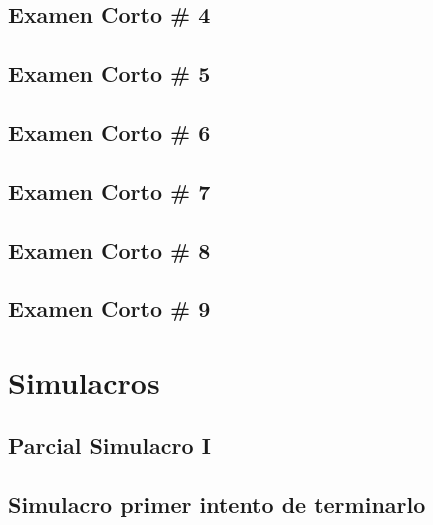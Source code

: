 \documentclass[openany]{book}
\begin{document}
\chapter{Examen Corto \# 4}
% 

\chapter{Examen Corto \# 5}


\chapter{Examen Corto \# 6}


\chapter{Examen Corto \# 7}


\chapter{Examen Corto \# 8}


\chapter{Examen Corto \# 9}




\part{Simulacros}
\chapter{Parcial Simulacro I}


\chapter{Simulacro primer intento de terminarlo}

\end{document}
